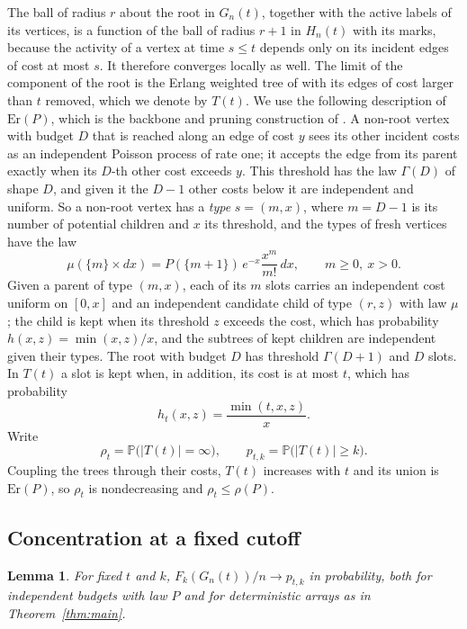 \documentclass[11pt]{amsart}
\newtheorem{lemma}[theorem]{Lemma}
\theoremstyle{remark}
\numberwithin{equation}{section}
\newcommand{\Pp}{\mathbb P}
\newcommand{\1}{\mathbf 1}
\newcommand{\Er}{\mathrm{Er}}
\begin{document}
The ball of radius $r$ about the root in $G_n(t)$, together with the active labels of its vertices, is a function of the ball of radius $r+1$ in $H_n(t)$ with its marks, because the activity of a vertex at time $s\le t$ depends only on its incident edges of cost at most $s$. It therefore converges locally as well. The limit of the component of the root is the Erlang weighted tree of \cite{EWT} with its edges of cost larger than $t$ removed, which we denote by $T(t)$. We use the following description of $\Er(P)$, which is the backbone and pruning construction of \cite{EWT}. A non-root vertex with budget $D$ that is reached along an edge of cost $y$ sees its other incident costs as an independent Poisson process of rate one; it accepts the edge from its parent exactly when its $D$-th other cost exceeds $y$. This threshold has the law $\Gamma(D)$ of shape $D$, and given it the $D-1$ other costs below it are independent and uniform. So a non-root vertex has a \emph{type} $s=(m,x)$, where $m=D-1$ is its number of potential children and $x$ its threshold, and the types of fresh vertices have the law
\[
\mu(\{m\}\times dx)=P(\{m+1\})\,e^{-x}\frac{x^m}{m!}\,dx,\qquad m\ge0,\ x>0.
\]
Given a parent of type $(m,x)$, each of its $m$ slots carries an independent cost uniform on $[0,x]$ and an independent candidate child of type $(r,z)$ with law $\mu$; the child is kept when its threshold $z$ exceeds the cost, which has probability $h(x,z)=\min(x,z)/x$, and the subtrees of kept children are independent given their types. The root with budget $D$ has threshold $\Gamma(D+1)$ and $D$ slots. In $T(t)$ a slot is kept when, in addition, its cost is at most $t$, which has probability
\[
h_t(x,z)=\frac{\min(t,x,z)}{x}.
\]
Write
\[
\rho_t=\Pp\bigl(|T(t)|=\infty\bigr),\qquad p_{t,k}=\Pp\bigl(|T(t)|\ge k\bigr).
\]
Coupling the trees through their costs, $T(t)$ increases with $t$ and its union is $\Er(P)$, so $\rho_t$ is nondecreasing and $\rho_t\le\rho(P)$.

\subsection{Concentration at a fixed cutoff}

\begin{lemma}\label{lem:conc-t}
For fixed $t$ and $k$, $F_k(G_n(t))/n\to p_{t,k}$ in probability, both for independent budgets with law $P$ and for deterministic arrays as in Theorem~\ref{thm:main}.
\end{lemma}
\end{document}
